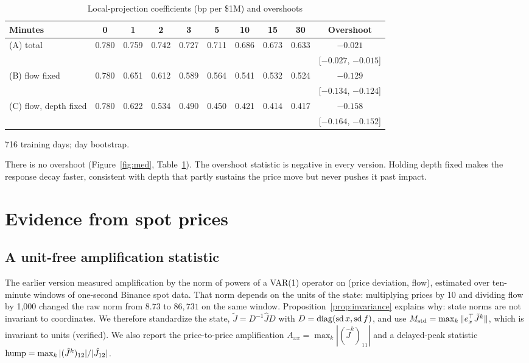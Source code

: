 \documentclass[12pt]{article}
\theoremstyle{definition}
\theoremstyle{remark}
\begin{document}
\begin{table}[t]\centering\small
\begin{threeparttable}
\caption{Local-projection coefficients (bp per \$1M) and overshoots}\label{tab:d4}
\setlength{\tabcolsep}{3.5pt}
\begin{tabular}{lccccccccc}
\toprule
Minutes & 0 & 1 & 2 & 3 & 5 & 10 & 15 & 30 & Overshoot\\
\midrule
(A) total & 0.780 & 0.759 & 0.742 & 0.727 & 0.711 & 0.686 & 0.673 & 0.633 & $-0.021$\\
 & & & & & & & & & [$-0.027$, $-0.015$]\\
(B) flow fixed & 0.780 & 0.651 & 0.612 & 0.589 & 0.564 & 0.541 & 0.532 & 0.524 & $-0.129$\\
 & & & & & & & & & [$-0.134$, $-0.124$]\\
(C) flow, depth fixed & 0.780 & 0.622 & 0.534 & 0.490 & 0.450 & 0.421 & 0.414 & 0.417 & $-0.158$\\
 & & & & & & & & & [$-0.164$, $-0.152$]\\
\bottomrule
\end{tabular}
\begin{tablenotes}\footnotesize\item 716 training days; day bootstrap. \end{tablenotes}
\end{threeparttable}
\end{table}

There is no overshoot (Figure~\ref{fig:med}, Table~\ref{tab:d4}). The overshoot statistic is negative in every version. Holding depth fixed makes the response decay faster, consistent with depth that partly sustains the price move but never pushes it past impact.

\section{Evidence from spot prices}\label{sec:spot}

\subsection{A unit-free amplification statistic}
The earlier version measured amplification by the norm of powers of a VAR(1) operator on (price deviation, flow), estimated over ten-minute windows of one-second Binance spot data. That norm depends on the units of the state: multiplying prices by 10 and dividing flow by 1,000 changed the raw norm from $8.73$ to $86{,}731$ on the same window. Proposition~\ref{prop:invariance} explains why: state norms are not invariant to coordinates. We therefore standardize the state, $\tilde J=D^{-1}\hat JD$ with $D={\rm diag}({\rm sd}\,x,{\rm sd}\,f)$, and use $M_{\rm std}=\max_k\|e_x^\top\tilde J^k\|$, which is invariant to units (verified). We also report the price-to-price amplification $A_{xx}=\max_k|(\hat J^k)_{11}|$ and a delayed-peak statistic ${\rm hump}=\max_k|(\hat J^k)_{12}|/|\hat J_{12}|$.
\end{document}
